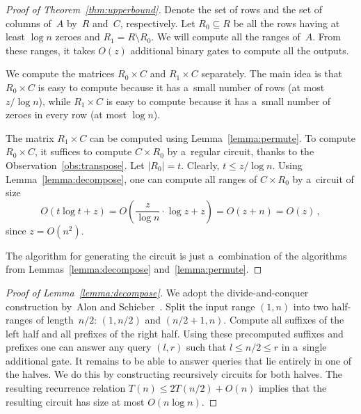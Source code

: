 \documentclass[a4paper,UKenglish,cleveref, autoref]{lipics-v2019}
\begin{document}
\begin{proof}[Proof of Theorem~\ref{thm:upperbound}]
Denote the set of rows and the set of columns of~$A$ by~$R$
and~$C$, respectively. Let $R_0 \subseteq R$ be all the rows
having at least $\log n$ zeroes and $R_1=R \setminus R_0$.
We will compute all the ranges of~$A$. From these ranges,
it takes $O(z)$ additional binary gates to compute all the outputs.

We compute the matrices $R_0 \times C$ and $R_1 \times C$
separately. The main idea is that $R_0 \times C$ is easy to compute
because it has a~small number of rows (at most $z/\log n$), while $R_1 \times C$
is easy to compute because it has a~small number of zeroes in every row (at most $\log n$).

The matrix $R_1 \times C$ can be computed using
Lemma~\ref{lemma:permute}. To compute
$R_0 \times C$,
it suffices to compute $C \times R_0$ by a~regular circuit,
thanks to the Observation~\ref{obs:transpose}.
Let $|R_0|=t$. Clearly, $t \le z/\log n$.
Using Lemma~\ref{lemma:decompose}, one can compute all
ranges of $C \times R_0$ by a~circuit of size
\[O(t\log t+z)=O\left(\frac{z}{\log n} \cdot \log z+z\right)=O(z+n)=O(z)\, ,\]
since $z =O(n^2)$.

The algorithm for generating the circuit is just a~combination
of the algorithms from Lemmas~\ref{lemma:decompose} and~\ref{lemma:permute}.
\end{proof}

\begin{proof}[Proof of Lemma~\ref{lemma:decompose}]
We adopt the divide-and-conquer construction by~Alon and Schieber~\cite{Alon87optimalpreprocessing}.
Split the input range $(1,n)$ into two half-ranges of
length~$n/2$:
$(1,n/2)$ and $(n/2+1,n)$.
Compute all suffixes of the left half and all prefixes of
the right half.
Using these precomputed suffixes and
prefixes one can answer any query $(l,r)$ such that $l \le n/2
\le r$ in a~single additional gate. It remains to be able to answer
queries that lie entirely in one of the halves. We do this by
constructing recursively circuits for both halves. The resulting
recurrence relation $T(n) \le 2T(n/2)+O(n)$ implies that the
resulting circuit has size at most $O(n\log n)$.
\end{proof}
\end{document}
